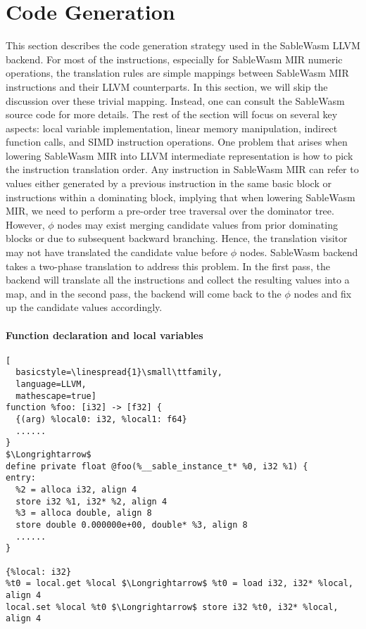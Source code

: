 \section{Code Generation}
\label{section:runtime-codegen}

This section describes the code generation strategy used in the SableWasm LLVM
backend. For most of the instructions, especially for SableWasm MIR numeric
operations, the translation rules are simple mappings between SableWasm MIR
instructions and their LLVM counterparts. In this section, we will skip the
discussion over these trivial mapping. Instead, one can consult the SableWasm
source code for more details. The rest of the section will focus on several
key aspects: local variable implementation, linear memory manipulation,
indirect function calls, and SIMD instruction operations. One problem that
arises when lowering SableWasm MIR into LLVM intermediate representation is
how to pick the instruction translation order. Any instruction in SableWasm MIR
can refer to values either generated by a previous instruction in the same basic
block or instructions within a dominating block, implying that when lowering
SableWasm MIR, we need to perform a pre-order tree traversal over the dominator
tree. However, $\phi$ nodes may exist merging candidate values from prior
dominating blocks or due to subsequent backward branching.
Hence, the translation visitor may not have translated the candidate value
before $\phi$ nodes. SableWasm backend takes a two-phase translation to address
this problem. In the first pass, the backend will translate all the instructions
and collect the resulting values into a map, and in the second pass, the backend
will come back to the $\phi$ nodes and fix up the candidate values accordingly.

\paragraph{Function declaration and local variables} \quad
\begin{lstlisting}[
  basicstyle=\linespread{1}\small\ttfamily, 
  language=LLVM, 
  mathescape=true]
function %foo: [i32] -> [f32] {
  {(arg) %local0: i32, %local1: f64} 
  ......
}
$\Longrightarrow$
define private float @foo(%__sable_instance_t* %0, i32 %1) {
entry:
  %2 = alloca i32, align 4
  store i32 %1, i32* %2, align 4
  %3 = alloca double, align 8
  store double 0.000000e+00, double* %3, align 8
  ......
}

{%local: i32} 
%t0 = local.get %local $\Longrightarrow$ %t0 = load i32, i32* %local, align 4
local.set %local %t0 $\Longrightarrow$ store i32 %t0, i32* %local, align 4
\end{lstlisting}

